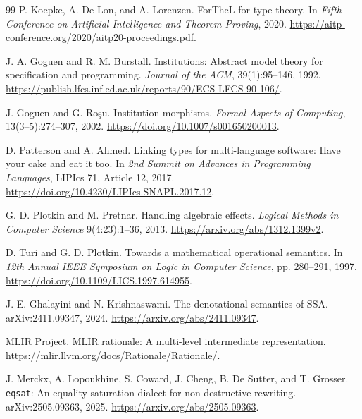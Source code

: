 \documentclass[11pt]{article}
\theoremstyle{definition}
\theoremstyle{remark}
\begin{document}
\begin{thebibliography}{99}
P. Koepke, A. De Lon, and A. Lorenzen.
\newblock ForTheL for type theory.
\newblock In \emph{Fifth Conference on Artificial Intelligence and Theorem
  Proving}, 2020.
\newblock \url{https://aitp-conference.org/2020/aitp20-proceedings.pdf}.

J. A. Goguen and R. M. Burstall.
\newblock Institutions: Abstract model theory for specification and
  programming.
\newblock \emph{Journal of the ACM}, 39(1):95--146, 1992.
\newblock \url{https://publish.lfcs.inf.ed.ac.uk/reports/90/ECS-LFCS-90-106/}.

J. Goguen and G. Ro\c{s}u.
\newblock Institution morphisms.
\newblock \emph{Formal Aspects of Computing}, 13(3--5):274--307, 2002.
\newblock \url{https://doi.org/10.1007/s001650200013}.

D. Patterson and A. Ahmed.
\newblock Linking types for multi-language software: Have your cake and eat it
  too.
\newblock In \emph{2nd Summit on Advances in Programming Languages}, LIPIcs
  71, Article 12, 2017.
\newblock \url{https://doi.org/10.4230/LIPIcs.SNAPL.2017.12}.

G. D. Plotkin and M. Pretnar.
\newblock Handling algebraic effects.
\newblock \emph{Logical Methods in Computer Science} 9(4:23):1--36, 2013.
\newblock \url{https://arxiv.org/abs/1312.1399v2}.

D. Turi and G. D. Plotkin.
\newblock Towards a mathematical operational semantics.
\newblock In \emph{12th Annual IEEE Symposium on Logic in Computer Science},
  pp. 280--291, 1997.
\newblock \url{https://doi.org/10.1109/LICS.1997.614955}.

J. E. Ghalayini and N. Krishnaswami.
\newblock The denotational semantics of SSA.
\newblock arXiv:2411.09347, 2024.
\newblock \url{https://arxiv.org/abs/2411.09347}.

MLIR Project.
\newblock MLIR rationale: A multi-level intermediate representation.
\newblock \url{https://mlir.llvm.org/docs/Rationale/Rationale/}.

J. Merckx, A. Lopoukhine, S. Coward, J. Cheng, B. De Sutter, and T. Grosser.
\newblock \texttt{eqsat}: An equality saturation dialect for non-destructive
  rewriting.
\newblock arXiv:2505.09363, 2025.
\newblock \url{https://arxiv.org/abs/2505.09363}.


\end{thebibliography}
\end{document}
